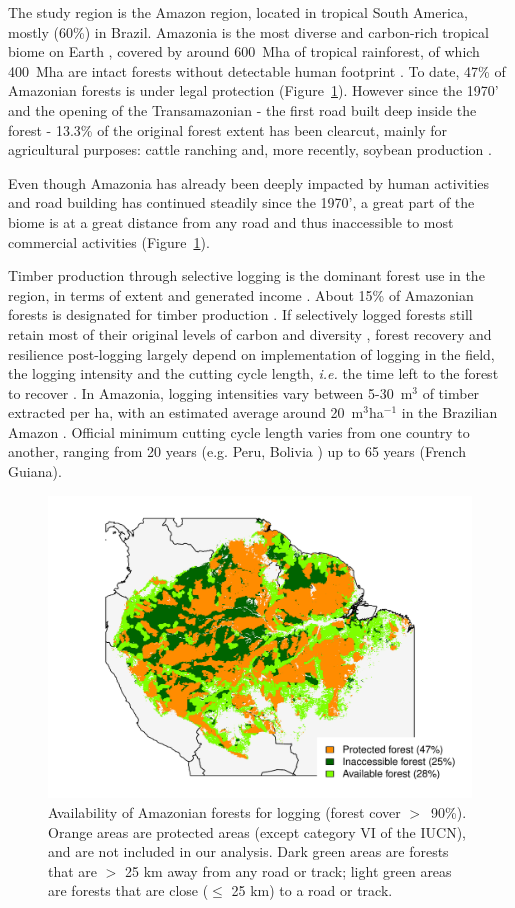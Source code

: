 \documentclass{article}
\begin{document}
The study region is the Amazon region, located in tropical South America, mostly (60\%) in Brazil. Amazonia is the most diverse and carbon-rich tropical biome on Earth \cite{Avitabile2016,Pimm2014}, covered by around 600~Mha of tropical rainforest, of which 400~Mha are intact forests without detectable human footprint \cite{Potapov2017}. To date, 47\% of Amazonian forests is under legal protection \cite{WDPA2016} (Figure~\ref{fig:pharv}). However since the 1970' and the opening of the Transamazonian - the first road built deep inside the forest - 13.3\% of the original forest extent has been clearcut, mainly for agricultural purposes: cattle ranching and, more recently, soybean production \cite{Fearnside2017}. 

Even though Amazonia has already been deeply impacted by human activities and road building has continued steadily since the 1970', a great part of the biome is at a great distance from any road and thus inaccessible to most commercial activities (Figure~\ref{fig:pharv}).

Timber production through selective logging is the dominant forest use in the region, in terms of extent and generated income \cite{Blaser2011}. About 15\% of Amazonian forests is designated for timber production \cite{FAO2011}. If selectively logged forests still retain most of their original levels of carbon and diversity \cite{Putz2012}, forest recovery and resilience post-logging largely depend on implementation of logging in the field, the logging intensity and the cutting cycle length, \textit{i.e.} the time left to the forest to recover \cite{Rutishauser2015,Piponiot2018}. In Amazonia, logging intensities vary between 5-30~m$^3$ of timber extracted per ha, with an estimated average around 20~m$^3$ha$^{-1}$ in the Brazilian Amazon \cite{Asner2005}. Official minimum cutting cycle length varies from one country to another, ranging from 20 years (e.g. Peru, Bolivia \cite{Fredericksen2003,Blaser2011}) up to 65 years (French Guiana). 

\begin{figure}
    \centering
    \includegraphics[width=0.8\linewidth]{graphs/harv_areas.pdf}
    \caption{Availability of Amazonian forests for logging (forest cover $>$~90\%). Orange areas are protected areas (except category VI of the IUCN), and are not included in our analysis. Dark green areas are forests that are $>$ 25 km away from any road or track; light green areas are forests that are close ($\leq$ 25 km) to a road or track.}
    \label{fig:pharv}
\end{figure}
\end{document}
